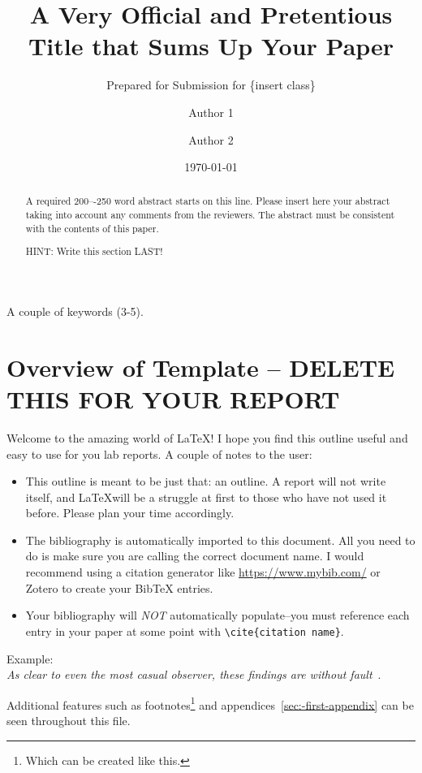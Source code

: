 \documentclass{juniorlabs}
\title{A Very Official and Pretentious Title that Sums Up Your Paper}
\subtitle{Prepared for Submission for \{insert class\}}
\author[1]{Author 1}
\author[2]{Author 2}
\affil[1]{University 1, Address 1, City, Country}
\affil[2]{University 2, Address 2, City, Country}
\date{\today}
\begin{document}
    \ReportHeading

    \begin{abstract}
        A required 200–-250 word abstract starts on this line.
        Please insert here your abstract taking into account any comments from the reviewers.
        The abstract must be consistent with the contents of this paper.

        HINT: Write this section LAST!
    \end{abstract}

    \begin{keywords}
        A couple of keywords (3-5).
    \end{keywords}





    \section*{Overview of Template -- DELETE THIS FOR YOUR REPORT}
    Welcome to the amazing world of \LaTeX!
    I hope you find this outline useful and easy to use for you lab reports.
    A couple of notes to the user:
    \begin{itemize}
        \item This outline is meant to be just that: an outline. A report will not write itself, and \LaTeX will be a struggle at first to those who have not used it before. Please plan your time accordingly.
        \item The bibliography is automatically imported to this document. All you need to do is make sure you are calling the correct document name. I would recommend using a citation generator like \url{https://www.mybib.com/} or Zotero to create your BibTeX entries.
        \item Your bibliography will \emph{NOT} automatically populate--you must reference each entry in your paper at some point with \verb|\cite{citation name}|.
    \end{itemize}

    Example: \\
    \textit{As clear to even the most casual observer, these findings are without fault}~\cite{EXAMPLE}.

    Additional features such as footnotes\footnote{Which can be created like this.} and appendices~\ref{sec:-first-appendix} can be seen throughout this file.
\end{document}
